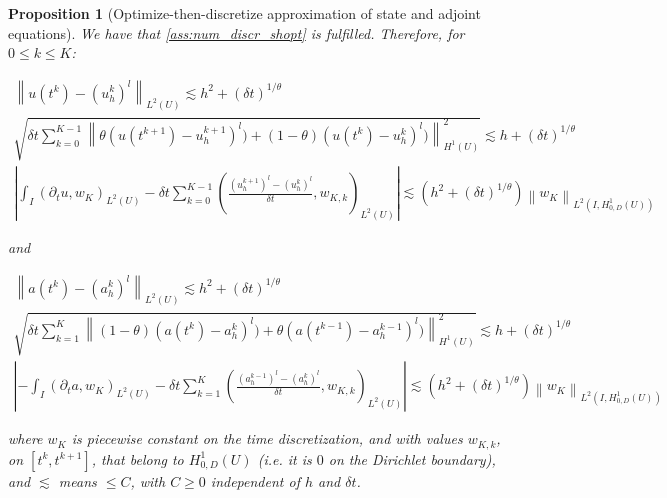 \documentclass[english,a4paper,10pt,oneside]{scrbook}	%
\theoremstyle{break}
\newtheorem{prop}[equation]{Proposition}
\theoremstyle{remark}
\newcommand{\norm}[1]{\left\lVert#1\right\rVert}
\begin{document}
\begin{prop}[Optimize-then-discretize approximation of state and adjoint equations]
\label{prop:o-t-d}
We have that \cref{ass:num_discr_shopt} is fulfilled. Therefore, for $0\leq k \leq K$:

\begin{align*}
	\norm{u(t^k)-(u_h^k)^l}_{L^2(U)}\lesssim  h^2 + (\delta t)^{1/\theta}\\
	\sqrt{\delta t \sum_{k=0}^{K-1} \norm{\theta(u(t^{k+1}) - u_h^{k+1})^l) + (1-\theta)(u(t^{k}) - u_h^{k})^l)}_{H^1(U)}^2} \lesssim h + (\delta t)^{1/\theta}\\
	\left | \int_I (\partial_t u , w_K)_{L^2(U)}-\delta t \sum_{k=0}^{K-1}\left ( \frac{(u^{k+1}_h)^l - (u_h^k)^l}{\delta t} , w_{K,k}\right )_{L^2(U)} \right |\lesssim \left ( h^2 + (\delta t)^{1/\theta} \right ) \norm{w_K}_{L^2(I,H^1_{0,D}(U))}
\end{align*}

and

\begin{align*}
	\norm{a(t^k)-(a_h^k)^l}_{L^2(U)}\lesssim  h^2 + (\delta t)^{1/\theta}\\
	\sqrt{\delta t \sum_{k=1}^{K} \norm{(1-\theta)(a(t^{k}) - a_h^{k})^l) + \theta(a(t^{k-1}) - a_h^{k-1})^l)}_{H^1(U)}^2} \lesssim h + (\delta t)^{1/\theta}\\
	\left |- \int_I (\partial_t a , w_K)_{L^2(U)}-\delta t \sum_{k=1}^{K}\left ( \frac{(a^{k-1}_h)^l - (a_h^{k})^l}{\delta t} , w_{K,k}\right )_{L^2(U)} \right |\lesssim \left ( h^2 + (\delta t)^{1/\theta} \right ) \norm{w_K}_{L^2(I,H^1_{0,D}(U))}
\end{align*}

where $w_K$ is piecewise constant on the time discretization, and with values $w_{K,k}$, on $[t^k,t^{k+1}]$, that belong to $H^1_{0,D}(U)$ (i.e. it is $0$ on the Dirichlet boundary), and $\lesssim$ means $\leq C$, with $C\geq 0$ independent of $h$ and $\delta t$.

\end{prop}
\end{document}
